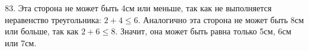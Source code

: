 83. Эта сторона не может быть 4см или меньше, так как не выполняется неравенство треугольника: $2+4\leqslant6.$ Аналогично эта сторона не может быть 8см или больше, так как $2+6\leqslant8.$ Значит, она может быть равна только 5см, 6см или 7см.\\
